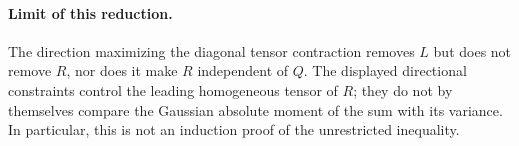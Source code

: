 \documentclass[11pt]{article}
\begin{document}
\paragraph{Limit of this reduction.}
The direction maximizing the diagonal tensor contraction removes $L$ but
does not remove $R$, nor does it make $R$ independent of $Q$. The displayed
directional constraints control the leading homogeneous tensor of $R$;
they do not by themselves compare the Gaussian absolute moment of the sum
with its variance. In particular, this is not an induction proof of the
unrestricted inequality.
\end{document}
